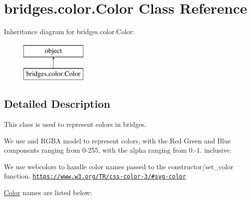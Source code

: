 \hypertarget{classbridges_1_1color_1_1_color}{}\section{bridges.\+color.\+Color Class Reference}
\label{classbridges_1_1color_1_1_color}
Inheritance diagram for bridges.\+color.\+Color\+:\begin{figure}[H]
\begin{center}
\leavevmode
\includegraphics[height=2.000000cm]{classbridges_1_1color_1_1_color}
\end{center}
\end{figure}


\subsection{Detailed Description}
This class is used to represent colors in bridges. 

We use and R\+G\+BA model to represent colors, with the Red Green and Blue components ranging from 0-\/255, with the alpha ranging from 0.-\/1. inclusive.

We use webcolors to handle color names passed to the constructor/set\+\_\+color function. \href{https://www.w3.org/TR/css-color-3/#svg-color}{\tt https\+://www.\+w3.\+org/\+T\+R/css-\/color-\/3/\#svg-\/color}

\mbox{\hyperlink{classbridges_1_1color_1_1_color}{Color}} names are listed below\+:~\newline



